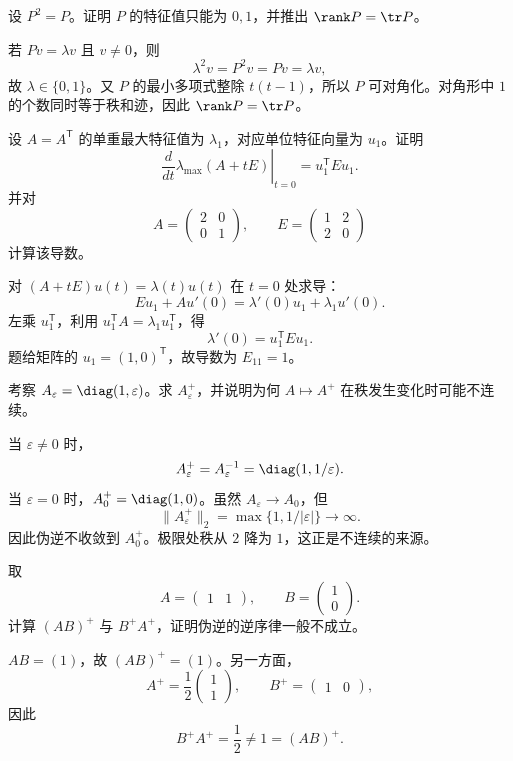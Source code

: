 \begin{exercise}[level=advanced]
设 $P^2=P$。证明 $P$ 的特征值只能为 $0,1$，并推出
$\rank P=\tr P$。
\begin{solution}
若 $Pv=\lambda v$ 且 $v\ne0$，则
\[
\lambda^2v=P^2v=Pv=\lambda v,
\]
故 $\lambda\in\{0,1\}$。又 $P$ 的最小多项式整除 $t(t-1)$，所以 $P$ 可对角化。对角形中 $1$ 的个数同时等于秩和迹，因此
$\rank P=\tr P$。
\end{solution}
\end{exercise}

\begin{exercise}[level=advanced]
设 $A=A^{\mathsf T}$ 的单重最大特征值为 $\lambda_1$，对应单位特征向量为 $u_1$。证明
\[
\left.\frac{d}{dt}\lambda_{\max}(A+tE)\right|_{t=0}
=u_1^{\mathsf T}Eu_1.
\]
并对
\[
A=\begin{pmatrix}2&0\\0&1\end{pmatrix},
\qquad E=\begin{pmatrix}1&2\\2&0\end{pmatrix}
\]
计算该导数。
\begin{solution}
对 $(A+tE)u(t)=\lambda(t)u(t)$ 在 $t=0$ 处求导：
\[
Eu_1+Au'(0)=\lambda'(0)u_1+\lambda_1u'(0).
\]
左乘 $u_1^{\mathsf T}$，利用
$u_1^{\mathsf T}A=\lambda_1u_1^{\mathsf T}$，得
\[
\lambda'(0)=u_1^{\mathsf T}Eu_1.
\]
题给矩阵的 $u_1=(1,0)^{\mathsf T}$，故导数为
$E_{11}=1$。
\end{solution}
\end{exercise}

\begin{exercise}[level=advanced]
考察 $A_\varepsilon=\diag(1,\varepsilon)$。求 $A_\varepsilon^+$，并说明为何 $A\mapsto A^+$ 在秩发生变化时可能不连续。
\begin{solution}
当 $\varepsilon\ne0$ 时，
\[
A_\varepsilon^+=A_\varepsilon^{-1}
=\diag(1,1/\varepsilon).
\]
当 $\varepsilon=0$ 时，$A_0^+=\diag(1,0)$。虽然
$A_\varepsilon\to A_0$，但
\[
\lVert A_\varepsilon^+\rVert_2
=\max\{1,1/|\varepsilon|\}\to\infty.
\]
因此伪逆不收敛到 $A_0^+$。极限处秩从 $2$ 降为 $1$，这正是不连续的来源。
\end{solution}
\end{exercise}

\begin{exercise}[level=advanced]
取
\[
A=\begin{pmatrix}1&1\end{pmatrix},
\qquad B=\begin{pmatrix}1\\0\end{pmatrix}.
\]
计算 $(AB)^+$ 与 $B^+A^+$，证明伪逆的逆序律一般不成立。
\begin{solution}
$AB=(1)$，故 $(AB)^+=(1)$。另一方面，
\[
A^+=\frac12\begin{pmatrix}1\\1\end{pmatrix},
\qquad B^+=\begin{pmatrix}1&0\end{pmatrix},
\]
因此
\[
B^+A^+=\frac12\ne1=(AB)^+.
\]
\end{solution}
\end{exercise}

